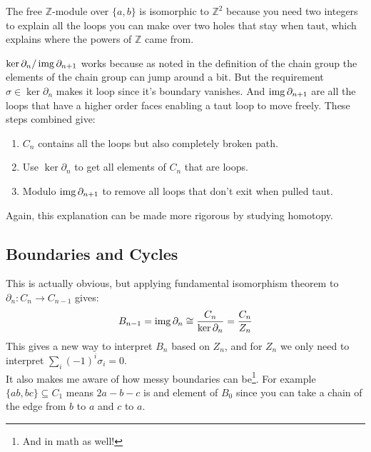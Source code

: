 \begin{center}
\end{center}

The free $\mathbb{Z}$-module over $\{a,b\}$ is isomorphic to $\mathbb{Z}^2$ because you need two integers to explain all the loops you can make over two holes that stay when taut,
which explains where the powers of $\mathbb{Z}$ came from.

$\ker\partial_n / \operatorname{img}\partial_{n+1}$ works because as noted in the definition of the chain group the elements of the chain group can jump around a bit.
But the requirement $\sigma\in\ker\partial_n$ makes it loop since it's boundary vanishes.
And $\operatorname{img}\partial_{n+1}$ are all the loops that have a higher order faces enabling a taut loop to move freely.
These steps combined give:
\begin{enumerate}
	\item $C_n$ contains all the loops but also completely broken path.
	\item Use $\ker\partial_n$ to get all elements of $C_n$ that are loops.
	\item Modulo $\operatorname{img}\partial_{n+1}$ to remove all loops that don't exit when pulled taut.
\end{enumerate}
\mbox 
Again, this explanation can be made more rigorous by studying homotopy.

\subsection{Boundaries and Cycles}
This is actually obvious,
but applying fundamental isomorphism theorem to $\partial_n:C_n\rightarrow C_{n-1}$ gives:
\[ B_{n-1} = \operatorname{img}\partial_n\cong \frac{C_n}{\ker\partial_n} = \frac{C_n}{Z_n} \]
This gives a new way to interpret $B_n$ based on $Z_n$,
and for $Z_n$ we only need to interpret $\sum_i (-1)^i\sigma_i =0$.
\\

It also makes me aware of how messy boundaries can be\footnote{And in math as well!}.
For example $\{ab,bc\}\subseteq C_1$ means $2a-b-c$ is and element of $B_0$ since you can take a chain of the edge from $b$ to $a$ and $c$ to $a$.
